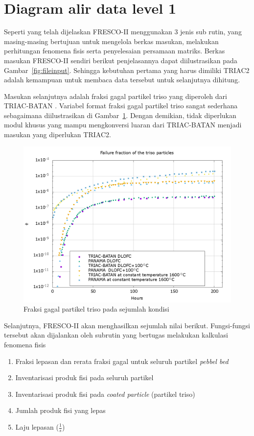 \documentclass[a4paper,11pt]{report}
\renewcommand{\figurename}{Gambar}
\begin{document}
\section{Diagram alir data level 1}
Seperti yang telah dijelaskan FRESCO-II menggunakan 3 jenis sub rutin, yang masing-masing bertujuan untuk mengelola berkas masukan, melakukan perhitungan fenomena fisis serta penyelesaian persamaan matriks. Berkas masukan FRESCO-II sendiri berikut penjelasannya dapat diilustrasikan pada \figurename~\ref{fig:fileinput}. Sehingga kebutuhan pertama yang harus dimiliki TRIAC2 adalah kemampuan untuk membaca data tersebut untuk selanjutnya dihitung.

Masukan selanjutnya adalah fraksi gagal partikel triso yang diperoleh dari TRIAC-BATAN \cite{triac1}. Variabel format fraksi gagal partikel triso sangat sederhana sebagaimana diilustrasikan di \figurename~\ref{fig:hasiltriac}. Dengan demikian, tidak diperlukan modul khusus yang mampu mengkonversi luaran dari TRIAC-BATAN menjadi masukan yang diperlukan TRIAC2. 

\begin{figure}[h!]
  \begin{center}
    \includegraphics[scale=.35]{pics/compareinit.png}
    \caption{Fraksi gagal partikel triso pada sejumlah kondisi \cite{triac1}}
    \label{fig:hasiltriac}
  \end{center}
\end{figure}

Selanjutnya, FRESCO-II akan menghasilkan sejumlah nilai berikut. Fungsi-fungsi tersebut akan dijalankan oleh subrutin yang bertugas melakukan kalkulasi fenomena fisis
\begin{enumerate}
  \item Fraksi lepasan dan rerata fraksi gagal untuk seluruh partikel \textit{pebbel bed}
  \item Inventarisasi produk fisi pada seluruh partikel
  \item Inventarisasi produk fisi pada \textit{coated particle} (partikel triso)
  \item Jumlah produk fisi yang lepas
  \item Laju lepasan ($\frac{1}{s}$)
\end{enumerate}
\end{document}
